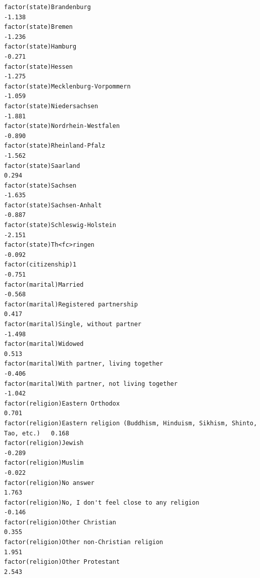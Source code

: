 \documentclass[
]{article}
\begin{document}
\begin{table}
\begin{minipage}[t]{\linewidth}
{\begin{verbatim}
factor(state)Brandenburg                                                           -1.138
factor(state)Bremen                                                                -1.236
factor(state)Hamburg                                                               -0.271
factor(state)Hessen                                                                -1.275
factor(state)Mecklenburg-Vorpommern                                                -1.059
factor(state)Niedersachsen                                                         -1.881
factor(state)Nordrhein-Westfalen                                                   -0.890
factor(state)Rheinland-Pfalz                                                       -1.562
factor(state)Saarland                                                               0.294
factor(state)Sachsen                                                               -1.635
factor(state)Sachsen-Anhalt                                                        -0.887
factor(state)Schleswig-Holstein                                                    -2.151
factor(state)Th<fc>ringen                                                          -0.092
factor(citizenship)1                                                               -0.751
factor(marital)Married                                                             -0.568
factor(marital)Registered partnership                                               0.417
factor(marital)Single, without partner                                             -1.498
factor(marital)Widowed                                                              0.513
factor(marital)With partner, living together                                       -0.406
factor(marital)With partner, not living together                                   -1.042
factor(religion)Eastern Orthodox                                                    0.701
factor(religion)Eastern religion (Buddhism, Hinduism, Sikhism, Shinto, Tao, etc.)   0.168
factor(religion)Jewish                                                             -0.289
factor(religion)Muslim                                                             -0.022
factor(religion)No answer                                                           1.763
factor(religion)No, I don't feel close to any religion                             -0.146
factor(religion)Other Christian                                                     0.355
factor(religion)Other non-Christian religion                                        1.951
factor(religion)Other Protestant                                                    2.543

\end{verbatim}}
\end{minipage}
\end{table}
\end{document}
